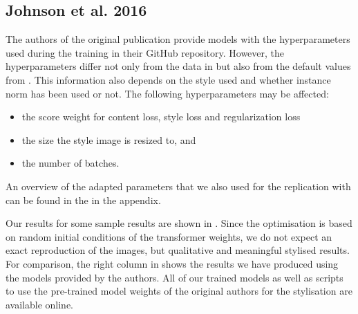 \subsection{Johnson et al. 2016}
The authors of the original publication provide models with the hyperparameters used during the training in their GitHub repository. However, the hyperparameters differ not only from the data in \paper{} but also from the default values from \implementation{}. This information also depends on the style used and whether instance norm has been used or not. The following hyperparameters may be affected:

\begin{itemize}
	\item the score weight for content loss, style loss and regularization loss
	\item the size the style image is resized to, and
	\item the number of batches.
\end{itemize}

An overview of the adapted parameters that we also used for the replication with \implementation{} can be found in the  in the appendix.

Our results for some sample results are shown in . Since the optimisation is based on random initial conditions of the transformer weights, we do not expect an exact reproduction of the images, but qualitative and meaningful stylised results. For comparison, the right column in  shows the results we have produced using the models provided by the authors. All of our trained models as well as scripts to use the pre-trained model weights of the original authors for the stylisation are available online.

